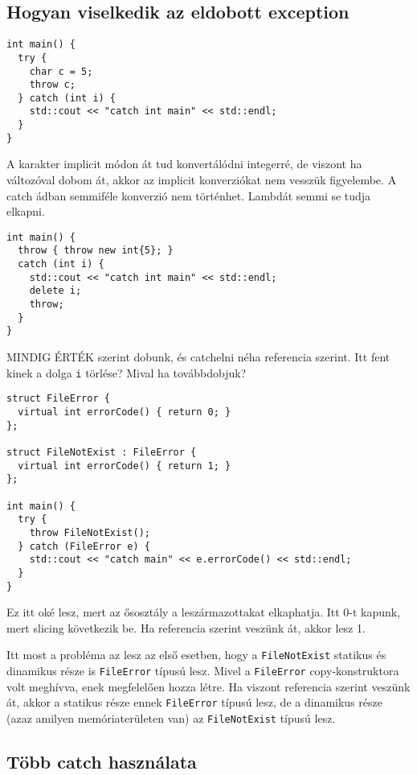\documentclass[a4paper,11.5pt]{article}
\begin{document}
		\subsection{Hogyan viselkedik az eldobott exception}
		
		\begin{lstlisting}
int main() {
  try {
    char c = 5;
    throw c;
  } catch (int i) {
    std::cout << "catch int main" << std::endl;
  }
}
		\end{lstlisting}
		A karakter implicit módon át tud konvertálódni integerré, de viszont ha változóval dobom át, akkor az implicit konverziókat nem vesszük figyelembe. A catch ádban semmiféle konverzió nem történhet. Lambdát semmi se tudja elkapni.
		
		\begin{lstlisting}
int main() {
  throw { throw new int{5}; }
  catch (int i) {
    std::cout << "catch int main" << std::endl;
    delete i;
    throw;
  }
}
		\end{lstlisting}
		MINDIG ÉRTÉK szerint dobunk, és catchelni néha referencia szerint. Itt fent kinek a dolga \texttt{i} törlése? Mival ha továbbdobjuk?
		
		\begin{lstlisting}
struct FileError {
  virtual int errorCode() { return 0; }
};

struct FileNotExist : FileError {
  virtual int errorCode() { return 1; }
};

int main() {
  try {
    throw FileNotExist();
  } catch (FileError e) {
    std::cout << "catch main" << e.errorCode() << std::endl;
  }
}
		\end{lstlisting}
		
		Ez itt oké lesz, mert az ősosztály a leszármazottakat elkaphatja. Itt 0-t kapunk, mert slicing következik be. Ha referencia szerint veszünk át, akkor lesz 1.
		
		Itt most a probléma az lesz az első esetben, hogy a \texttt{FileNotExist} statikus és dinamikus része is \texttt{FileError} típusú lesz. Mivel a \texttt{FileError} copy-konstruktora volt meghívva, enek megfelelően hozza létre. Ha viszont referencia szerint veszünk át, akkor a statikus része ennek \texttt{FileError} típusú lesz, de a dinamikus része (azaz amilyen memóriaterületen van) az \texttt{FileNotExist} típusú lesz. 
		
		\subsection{Több catch használata}
		
\end{document}
